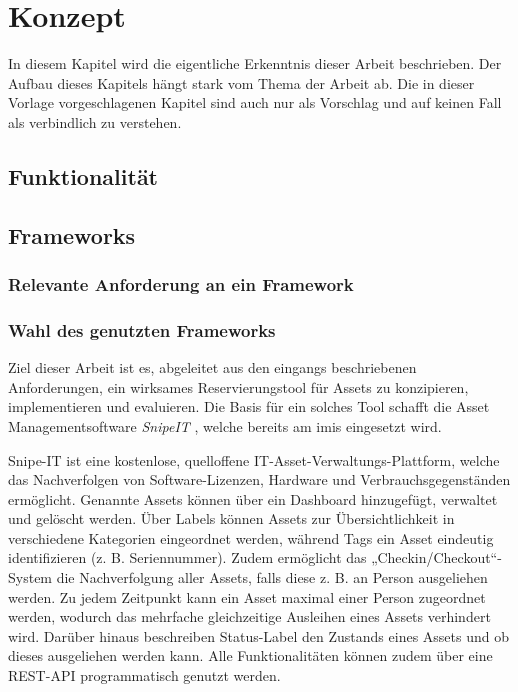 \chapter{Konzept}
\label{chapter-konzept}

In diesem Kapitel wird die eigentliche Erkenntnis dieser Arbeit beschrieben. Der Aufbau dieses
Kapitels hängt stark vom Thema der Arbeit ab. Die in dieser Vorlage vorgeschlagenen Kapitel sind
auch nur als Vorschlag und auf keinen Fall als verbindlich zu verstehen.

\section{Funktionalität}




\section{Frameworks} 

\subsection{Relevante Anforderung an ein Framework}
\subsection{Wahl des genutzten Frameworks}
Ziel dieser Arbeit ist es, abgeleitet aus den eingangs beschriebenen Anforderungen, ein wirksames
Reservierungstool für Assets zu konzipieren, implementieren und evaluieren. Die Basis für ein
solches Tool schafft die Asset Managementsoftware \textit{SnipeIT} \cite{noauthor_home_nodate},
welche bereits am \ac{imis} eingesetzt wird.

Snipe-IT ist eine kostenlose, quelloffene IT-Asset-Verwaltungs-Plattform,
welche das Nachverfolgen von Software-Lizenzen, Hardware und
Verbrauchsgegenständen ermöglicht. Genannte Assets können über ein Dashboard
hinzugefügt, verwaltet und gelöscht werden. Über Labels können Assets zur
Übersichtlichkeit in verschiedene Kategorien eingeordnet werden, während
Tags ein Asset eindeutig identifizieren (z. B. Seriennummer). Zudem ermöglicht
das „Checkin/Checkout“-System die Nachverfolgung aller Assets, falls diese
z. B.  an Person ausgeliehen werden. Zu jedem Zeitpunkt kann ein Asset
maximal einer Person zugeordnet werden, wodurch das mehrfache gleichzeitige
Ausleihen eines Assets verhindert wird. Darüber hinaus beschreiben Status-Label
den Zustands eines Assets und ob dieses ausgeliehen werden kann. Alle
Funktionalitäten können zudem über eine REST-API programmatisch genutzt werden.


